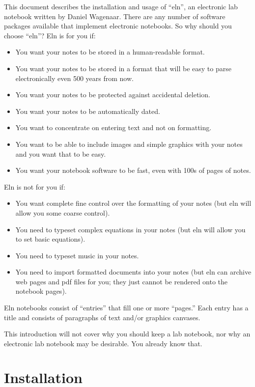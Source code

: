 \documentclass[11pt]{report}
\begin{document}
This document describes the installation and usage of ``eln'', an
electronic lab notebook written by Daniel Wagenaar. There are any
number of software packages available that implement electronic
notebooks. So why should you choose ``eln''? Eln is for you if:
\begin{itemize}
  \item You want your notes to be stored in a human-readable format.
  \item You want your notes to be stored in a format that will be easy to
    parse electronically even 500 years from now.
  \item You want your notes to be protected against accidental
    deletion.
  \item You want your notes to be automatically dated.
  \item You want to concentrate on entering text and not on
    formatting.
  \item You want to be able to include images and simple graphics with
    your notes and you want that to be easy.
  \item You want your notebook software to be fast, even with 100s
    of pages of notes.
\end{itemize}
\noindent Eln is not for you if:
\begin{itemize}
  \item You want complete fine control over the formatting of your notes
    (but eln will allow you some coarse control).
  \item You need to typeset complex equations in your notes (but eln
    will allow you to set basic equations).
  \item You need to typeset music in your notes.
  \item You need to import formatted documents into your notes (but
    eln can archive web pages and pdf files for you; they just cannot
    be rendered onto the notebook pages).
\end{itemize}

Eln notebooks consist of ``entries'' that fill one or more ``pages.''
Each entry has a title and consists of paragraphs of text and/or
graphics canvases.

This introduction
will not cover why you should keep a lab notebook, nor why an
electronic lab notebook may be desirable. You already know that. 

\chapter{Installation}
\end{document}

